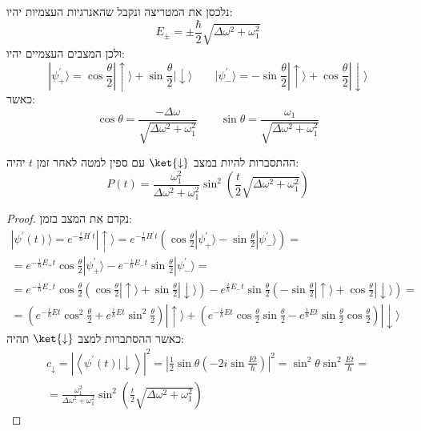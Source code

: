 \documentclass{tstextbook}
\begin{document}
נלכסן את המטריצה ונקבל שהאנרגיות העצמיות יהיו:
$$E_{\pm}= \pm \frac{\hbar}{2}\sqrt{ \Delta \omega^{2}+\omega_{1}^{2} }$$
ולכן המצבים העצמיים יהיו:
$$|\psi_{+}^{\prime}\rangle=\cos\frac{\theta}{2}|\uparrow\rangle+\sin\frac{\theta}{2}|\downarrow\rangle\qquad|\psi_{-}^{\prime}\rangle=-\sin\frac{\theta}{2}|\uparrow\rangle+\cos\frac{\theta}{2}|\downarrow\rangle$$
כאשר:
$$\cos\theta=\frac{-\Delta\omega}{\sqrt{\Delta\omega^{2}+\omega_{1}^{2}}}\qquad\sin\theta=\frac{\omega_{1}}{\sqrt{\Delta\omega^{2}+\omega_{1}^{2}}}$$

\begin{corollary}
ההתסברות להיות במצב \(\ket{\downarrow}\) עם ספין למטה לאחר זמן \(t\) יהיה:
$$P(t)=\frac{\omega_{1}^{2}}{\Delta\omega^{2}+\omega_{1}^{2}}\sin^{2}\left(\frac{t}{2}\sqrt{\Delta\omega^{2}+\omega_{1}^{2}}\right) $$

\end{corollary}
\begin{proof}
נקדם את המצב בזמן:
$$\begin{gather}|\psi^{\prime}(t)\rangle=e^{-\frac{i}{\hbar}H^{\prime}t}|\uparrow\rangle=e^{-\frac{i}{\hbar}H^{\prime}t}\left(\cos\frac{\theta}{2}|\psi_{+}^{\prime}\rangle-\sin\frac{\theta}{2}|\psi_{-}^{\prime}\rangle\right)=\\= e^{-\frac{i}{\hbar}E_{+}t}\cos\frac{\theta}{2}|\psi_{+}^{\prime}\rangle-e^{-\frac{i}{\hbar}E_{-}t}\sin\frac{\theta}{2}|\psi_{-}^{\prime}\rangle=\\=e^{-\frac{i}{\hbar}E_{-}t}\cos\frac{\theta}{2}\left(\cos\frac{\theta}{2}|\uparrow\rangle+\sin\frac{\theta}{2}|\downarrow\rangle\right)-e^{\frac{i}{\hbar}E_{-}t}\sin\frac{\theta}{2}\left(-\sin\frac{\theta}{2}|\uparrow\rangle+\cos\frac{\theta}{2}|\downarrow\rangle\right)=\\= \left(e^{-\frac{i}{\hbar}E t}\cos^{2}{\frac{\theta}{2}}+e^{\frac{i}{\hbar}E t}\sin^{2}{\frac{\theta}{2}}\right)|\uparrow\rangle+\left(e^{-\frac{i}{\hbar}E t}\cos{\frac{\theta}{2}}\sin{\frac{\theta}{2}}-e^{\frac{i}{\hbar}E t}\sin{\frac{\theta}{2}}\cos{\frac{\theta}{2}}\right)|\downarrow\rangle 
\end{gather}$$
כאשר ההסתברות למצב \(\ket{\downarrow}\) תהיה:
$$\begin{gather}c_{\downarrow}=|\left\langle \psi^{\prime}(t)|\downarrow \right\rangle|^{2}=|\frac{1}{2}\sin\theta\left(-2i\sin\frac{E t}{\hbar}\right)|^{2}=\sin^{2}\theta\sin^{2}\frac{E t}{\hbar}=\\=\frac{\omega_{1}^{2}}{\Delta\omega^{2}+\omega_{1}^{2}}\sin^{2}\left(\frac{t}{2}\sqrt{\Delta\omega^{2}+\omega_{1}^{2}}\right) 
\end{gather}$$

\end{proof}
\end{document}
